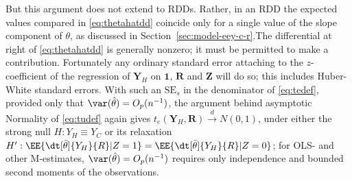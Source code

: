 But this argument does not extend to RDDs.  Rather, in an RDD the
expected values compared in \eqref{eq:thetahatdd} coincide only for a
single value of the slope component of $\theta$, as discussed in
Section~\ref{sec:model-eey-c-r}.The differential at right of
\eqref{eq:thetahatdd} is generally nonzero; it must be permitted to
make a contribution. Fortunately any ordinary standard error attaching
to the $z$-coefficient of the regression of ${\mathbf{Y}_{H}}$ on
$\mathbf{1}$, $\mathbf{R}$ and $\mathbf{Z}$ will do so; this includes
Huber-White standard errors.  With such an $\mathrm{SE}_{s}$ in the
denominator of \eqref{eq:tedef}, provided only that
$\var (\hat\theta ) = O_{p}(n^{-1})$, the argument behind asymptotic
Normality of \eqref{eq:tudef} again gives
$t_{e}({\mathbf{Y}_H}, \mathbf{R}) \stackrel{d}{\rightarrow} N(0, 1)$,
under either the strong null $H: {Y_H} \equiv Y_{C}$ or its relaxation
$H': \EE \{ \dt[\bar\theta]{Y_H}{R} | Z=1 \} = \EE \{
\dt[\bar\theta]{Y_H}{R} | Z=0 \}$;
for OLS- and other M-estimates, $\var (\hat\theta) = O_{p}(n^{-1})$
requires only independence and bounded second moments of the
observations.





